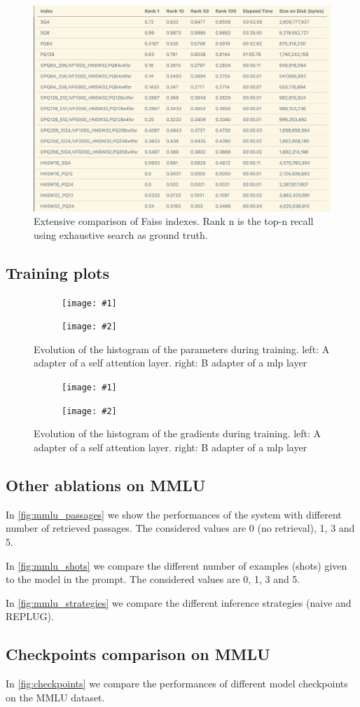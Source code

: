 \documentclass[11pt]{article}
\newcommand{\sideBySideImages}[5]{%
    \begin{figure}[ht]
        \centering
        \begin{subfigure}{#3\linewidth}
            \centering
            \texttt{[image: \#1]}
        \end{subfigure}%
        \hfill%
        \begin{subfigure}{#3\linewidth}
            \centering
            \texttt{[image: \#2]}
        \end{subfigure}
        \caption{#5}
        \label{#4}
    \end{figure}
}
\begin{document}
\begin{figure}[h]
    \centering
    \includegraphics[width=0.8\linewidth]{figures/faiss-indexes-extensive.png}
    \caption{Extensive comparison of Faiss indexes. Rank n is the top-n recall using exhaustive search as ground truth.}
    \label{fig:faiss-indexes-extensive}
\end{figure}

\subsection{Training plots}

\sideBySideImages{figures/paramsA.png}{figures/paramsB.png}{0.48}{fig:params}{Evolution of the histogram of the parameters during training. left: A adapter of a self attention layer. right: B adapter of a mlp layer}

\sideBySideImages{figures/gradientsA.png}{figures/gradientsB.png}{0.48}{fig:gradients}{Evolution of the histogram of the gradients during training. left: A adapter of a self attention layer. right: B adapter of a mlp layer}

\subsection{Other ablations on MMLU}

In \ref{fig:mmlu_passages} we show the performances of the system with different 
number of retrieved passages. The considered values are 0 (no retrieval), 1, 3 and 5.

In \ref{fig:mmlu_shots} we compare the different number of examples (shots) given to
the model in the prompt. The considered values are 0, 1, 3 and 5.

In \ref{fig:mmlu_strategies} we compare the different inference strategies (naive and REPLUG).

\subsection{Checkpoints comparison on MMLU}

In \ref{fig:checkpoints} we compare the performances of different model checkpoints on the MMLU dataset.
\end{document}
